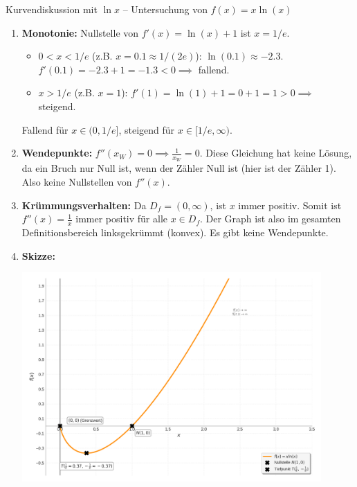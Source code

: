 \begin{beispielumgebung}{Kurvendiskussion mit \texorpdfstring{$\ln x$}{ln(x)} – Untersuchung von \texorpdfstring{$f(x) = x \ln(x)$}{f(x) = x ln(x)}}
\begin{enumerate}
        Tiefpunkt $T(1/e | -1/e)$.
    \item \textbf{Monotonie:} Nullstelle von $f'(x)=\ln(x)+1$ ist $x=1/e$.
        \begin{itemize}
            \item $0 < x < 1/e$ (z.B. $x=0.1 \approx 1/(2e)$): $\ln(0.1) \approx -2.3$. $f'(0.1) = -2.3+1 = -1.3 < 0 \implies$ fallend.
            \item $x > 1/e$ (z.B. $x=1$): $f'(1) = \ln(1)+1 = 0+1 = 1 > 0 \implies$ steigend.
        \end{itemize}
        Fallend für $x \in (0, 1/e]$, steigend für $x \in [1/e, \infty)$.
    \item \textbf{Wendepunkte:} $f''(x_W)=0 \implies \frac{1}{x_W}=0$. Diese Gleichung hat keine Lösung, da ein Bruch nur Null ist, wenn der Zähler Null ist (hier ist der Zähler 1). Also keine Nullstellen von $f''(x)$.
    \item \textbf{Krümmungsverhalten:} Da $D_f=(0,\infty)$, ist $x$ immer positiv. Somit ist $f''(x)=\frac{1}{x}$ immer positiv für alle $x \in D_f$.
        Der Graph ist also im gesamten Definitionsbereich linksgekrümmt (konvex). Es gibt keine Wendepunkte.
    \item \textbf{Skizze:}
        \begin{center}
            \includegraphics[width=0.9\textwidth]{grafiken/Kurvendiskussion_xlnx.png}
            \label{fig:kurvendisk_xlnx}
        \end{center}
\end{enumerate}
\end{beispielumgebung}


